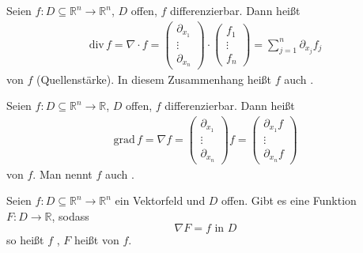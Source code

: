 \begin{theorem}[Definition]
  \begin{enum-arab}
    \item Seien $f : D \subseteq \mathbb{R}^n \to \mathbb{R}^n$, $D$ offen, $f$ differenzierbar. Dann heißt
    \begin{align*}
      \mathrm{div}\, f = \nabla \cdot f =
      \begin{pmatrix} \partial_{x_1} \\ \vdots \\ \partial_{x_n} \end{pmatrix}
      \cdot
      \begin{pmatrix} f_1 \\ \vdots \\ f_n \end{pmatrix}
      =
      \sum\limits_{j=1}^{n} \partial_{x_j} f_j
    \end{align*}
     von $f$ (Quellenstärke). In diesem Zusammenhang heißt $f$ auch .
    
    \item Seien $f : D \subseteq \mathbb{R}^n \to \mathbb{R}$, $D$ offen, $f$ differenzierbar. Dann heißt
    \begin{align*}
      \mathrm{grad}\, f = \nabla f = \begin{pmatrix} \partial_{x_1} \\ \vdots \\ \partial_{x_n} \end{pmatrix} f = \begin{pmatrix} \partial_{x_1} f \\ \vdots \\ \partial_{x_n} f \end{pmatrix}
    \end{align*}
     von $f$. Man nennt $f$ auch .
    
    \item Seien $f : D \subseteq \mathbb{R}^n \to \mathbb{R}^n$ ein Vektorfeld und $D$ offen. Gibt es eine Funktion $F : D \to \mathbb{R}$, sodass \[ \nabla F = f \text{ in } D \] so heißt $f$ , $F$ heißt  von $f$.
    

\end{enum-arab}
\end{theorem}
